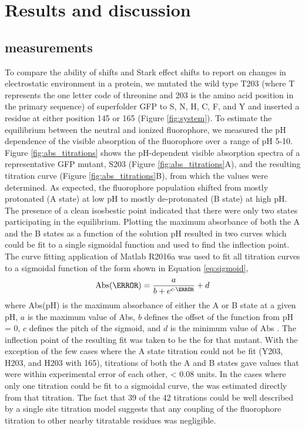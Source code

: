 \section{Results and discussion} \label{pKa-results}

\subsection{\pKa{} measurements}

To compare the ability of \pKa{} shifts and Stark effect shifts to report on changes in electrostatic environment in a protein, we mutated the wild type T203 (where T represents the one letter code of threonine and 203 is the amino acid position in the primary sequence) of superfolder GFP to S, N, H, C, F, and Y and inserted a \pCNF{} residue at either position 145 or 165 (Figure \ref{fig:system}). 
To estimate the equilibrium between the neutral and ionized fluorophore, we measured the pH dependence of the visible absorption of the fluorophore over a range of pH 5-10.  
Figure \ref{fig:abs_titrations} shows the pH-dependent visible absorption spectra of a representative GFP mutant, S203 (Figure \ref{fig:abs_titrations}A), and the resulting titration curve (Figure \ref{fig:abs_titrations}B), from which the \pKa{} values were determined. 
As expected, the fluorophore population shifted from mostly protonated (A state) at low pH to mostly de-protonated (B state) at high pH.
The presence of a clean isosbestic point indicated that there were only two states participating in the equilibrium.
Plotting the maximum absorbance of both the A and the B states as a function of the solution pH resulted in two curves which could be fit to a single sigmoidal function and used to find the inflection point.
The curve fitting application of Matlab R2016a was used to fit all titration curves to a sigmoidal function of the form shown in Equation \ref{eq:sigmoid},
\begin{equation}
    \text{Abs}(\pH) = \frac{a}{b+e^{c\cdot\pH}}+d
    \label{eq:sigmoid}
\end{equation}
where Abs(pH) is the maximum absorbance of either the A or B state at a given pH, $a$ is the maximum value of Abs, $b$ defines the offset of the function from pH = 0, $c$ defines the pitch of the sigmoid, and $d$ is the minimum value of Abs \cite{Matlab2016}.
The inflection point of the resulting fit was taken to be the \pKa{} for that mutant.
With the exception of the few cases where the A state titration could not be fit (Y203, H203, and H203 with \pCNF{} 165), titrations of both the A and B states gave \pKa{} values that were within experimental error of each other, < 0.08 \pKa{} units.
In the cases where only one titration could be fit to a sigmoidal curve, the \pKa{} was estimated directly from that titration.
The fact that 39 of the 42 titrations could be well described by a single site titration model suggests that any coupling of the fluorophore titration to other nearby titratable residues was negligible. 

